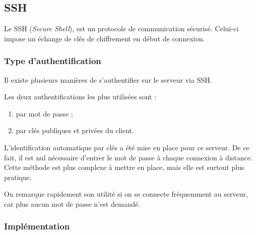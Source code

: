 \subsection{SSH}
\label{subsec:ssh}

Le SSH (\emph{Secure Shell}), est un protocole de communication
sécurisé. Celui-ci impose un échange de clés de chiffrement en début de
connexion.

\subsubsection{Type d'authentification}
\label{subsubsec:type-authentification}

Il existe plusieurs manières de s'authentifier sur le serveur via SSH.

Les deux authentifications les plus utilisées sont :
\begin{enumerate}
\item par mot de passe ;
\item par clés publiques et privées du client.
\end{enumerate}

L'identification automatique par clés a été mise en place pour ce serveur. De ce
fait, il est nul nécessaire d'entrer le mot de passe à chaque connexion à
distance. \\
Cette méthode est plus complexe à mettre en place, mais elle est surtout plus
pratique.

On remarque rapidement son utilité si on se connecte fréquemment au serveur, car
plus aucun mot de passe n'est demandé.

\subsubsection{Implémentation}
\label{subsubsec:implementation}

